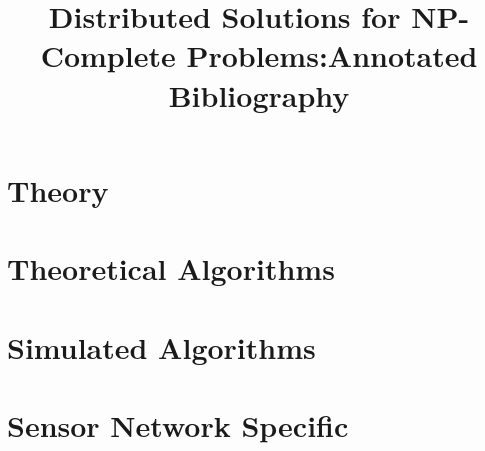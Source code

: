 

\bibliographyunit[\section]

\title{Distributed Solutions for NP-Complete Problems:Annotated Bibliography} 

\author{
}

\maketitle
\section{Theory}
\nocite{1011811}
\nocite{21723}
\nocite{mitchell06}
\putbib
\section{Theoretical Algorithms}
\nocite{1378540}
\nocite{Gonzalez1995129}
\nocite{1435381}
\nocite{Astrand:2009fk}
\nocite{1582746}
\nocite{254190}
\nocite{338269}
\nocite{1536432}
\nocite{1146387}
\putbib
\section{Simulated Algorithms}
\nocite{978-3-540-77220-0_36}
\nocite{IPDPS.2008.45361}
\nocite{1741522}
\nocite{1640702}
\putbib
\section{Sensor Network Specific}
\nocite{1346629}
\nocite{1525859}
\nocite{1464428}
\nocite{1514028}
\nocite{5425300}
\nocite{4697802}
\nocite{1498475}
\putbib
